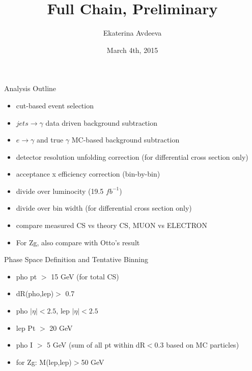 \documentclass{beamer}
\title{Full Chain, Preliminary}
\author{Ekaterina Avdeeva}
\institute{University of Nebraska - Lincoln}
\date{March 4th, 2015}
\begin{document}
\begin{frame}
\titlepage
\end{frame}

\begin{frame}{Analysis Outline}
{
  \begin{itemize}
  \item cut-based  event selection
  \item $jets \rightarrow \gamma$ data driven background subtraction
  \item $e \rightarrow \gamma $ and true $\gamma$ MC-based background subtraction
  \item detector resolution unfolding correction (for differential cross section only)
  \item acceptance x efficiency correction (bin-by-bin)
  \item divide over luminocity (19.5 $fb^{-1}$)
  \item divide over bin width (for differential cross section only)
  \item compare measured CS vs theory CS, MUON vs ELECTRON
  \item For Zg, also compare with Otto's result
  \end{itemize}
}
\end{frame}

\begin{frame}{Phase Space Definition and Tentative Binning}
{
  \begin{itemize}
  \item pho pt $>$ 15 GeV (for total CS)
  \item dR(pho,lep)$ >$ 0.7
  \item pho $|\eta|<2.5$, lep $|\eta|<2.5$
  \item lep Pt $>$ 20 GeV
  \item pho I $>$ 5 GeV (sum of all pt within dR$<$0.3 based on MC particles)
  \item for Zg: M(lep,lep)$>$50 GeV
  \end{itemize}
}
\end{frame}


\end{document}
